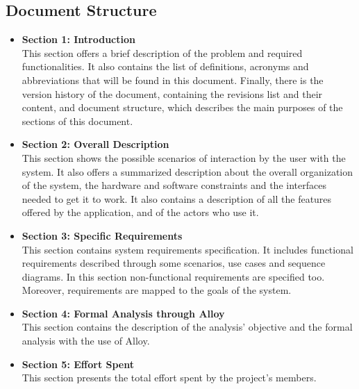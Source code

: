 \subsection{Document Structure}
\begin{itemize}
        \item \textbf{Section 1: Introduction} \\This section offers a brief description of the problem and required functionalities.
        It also contains the list of definitions, acronyms and abbreviations that will be found in this document.
        Finally, there is the version history of the document, containing the revisions list and their content, and document structure, 
        which describes the main purposes of the sections of this document.
        \item \textbf{Section 2: Overall Description} \\This section shows the possible scenarios of interaction by the user with the system. It also offers a summarized description about the overall organization of the system, the hardware and software constraints and the interfaces needed to get it to work.
        It also contains a description of all the features offered by the application, and of the actors who use it.
        
        \item \textbf{Section 3: Specific Requirements} \\This section contains system requirements specification. It includes functional requirements described through some scenarios, use cases and sequence diagrams. 
        In this section non-functional requirements are specified too. Moreover, requirements are mapped to the goals of the system.

        \item \textbf{Section 4: Formal Analysis through Alloy} \\This section contains the description of the analysis' objective and the formal analysis with the use of Alloy.
        \item \textbf{Section 5: Effort Spent} \\This section presents the total effort spent by the project's members.
\end{itemize}
